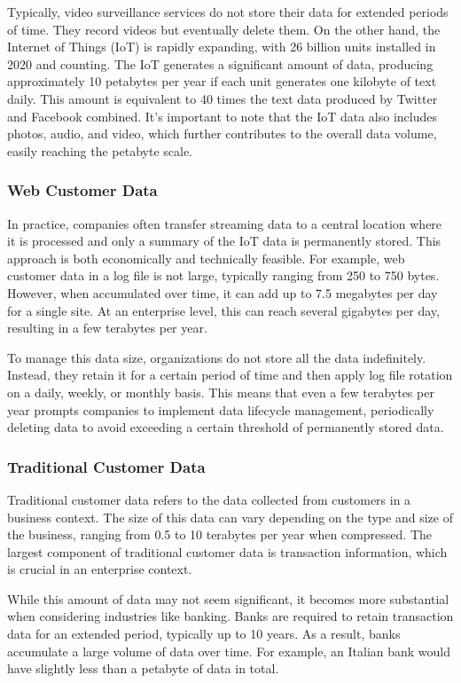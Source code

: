 Typically, video surveillance services do not store their data for
extended periods of time. They record videos but eventually delete them.
On the other hand, the Internet of Things (IoT) is rapidly expanding,
with 26 billion units installed in 2020 and counting. The IoT generates
a significant amount of data, producing approximately 10 petabytes per
year if each unit generates one kilobyte of text daily. This amount is
equivalent to 40 times the text data produced by Twitter and Facebook
combined. It's important to note that the IoT data also includes photos,
audio, and video, which further contributes to the overall data volume,
easily reaching the petabyte scale.

\subsubsection{Web Customer Data}

In practice, companies often transfer streaming data to a central
location where it is processed and only a summary of the IoT data is
permanently stored. This approach is both economically and technically
feasible. For example, web customer data in a log file is not large,
typically ranging from 250 to 750 bytes. However, when accumulated over
time, it can add up to 7.5 megabytes per day for a single site. At an
enterprise level, this can reach several gigabytes per day, resulting in
a few terabytes per year.

To manage this data size, organizations do not store all the data
indefinitely. Instead, they retain it for a certain period of time and
then apply log file rotation on a daily, weekly, or monthly basis. This
means that even a few terabytes per year prompts companies to implement
data lifecycle management, periodically deleting data to avoid exceeding
a certain threshold of permanently stored data.

\subsubsection{Traditional Customer Data}

Traditional customer data refers to the data collected from customers in
a business context. The size of this data can vary depending on the type
and size of the business, ranging from 0.5 to 10 terabytes per year when
compressed. The largest component of traditional customer data is
transaction information, which is crucial in an enterprise context.

While this amount of data may not seem significant, it becomes more
substantial when considering industries like banking. Banks are required
to retain transaction data for an extended period, typically up to 10
years. As a result, banks accumulate a large volume of data over time.
For example, an Italian bank would have slightly less than a petabyte of
data in total.

